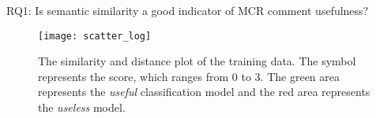 %
%
%
%
%
%


\begin{ResearchQuestions}
\item[RQ1:] Is semantic similarity a good indicator of MCR comment usefulness?
\end{ResearchQuestions}

\begin{figure}[!t]
\centering
\texttt{[image: scatter\_log]}
\caption{The similarity and distance plot of the training data.
The symbol represents the score, which ranges from 0 to 3.
The green area represents the \emph{useful} classification model and the red area represents the \emph{useless} model.}
\label{fig:scatter}
\end{figure}

